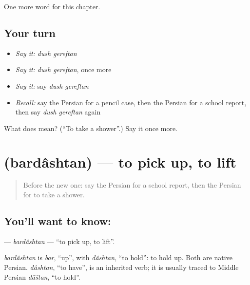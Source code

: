 \begin{grammarlens}[title={What you've built}]
One more word for this chapter.
\end{grammarlens}

\subsection*{Your turn}
\begin{itemize}
\raggedright
  \item \emph{Say it:} \emph{dush gereftan}
  \item \emph{Say it:} \emph{dush gereftan}, once more
  \item \emph{Say it:} say \emph{dush gereftan}
  \item \emph{Recall:} say the Persian for a pencil case, then the Persian for a school report, then say \emph{dush gereftan} again
\end{itemize}

\begin{tcolorbox}[breakable,colback=teal!4,colframe=teal!35!black,title={Before you move on}]
What does   mean? (\textquotedblleft{}To take a shower\textquotedblright{}.) Say it once more.
\end{tcolorbox}
\section[\texorpdfstring{\fa{برداشتن} (bardâshtan)}{برداشتن (bardâshtan)}]{ (bardâshtan) — to pick up, to lift}

\label{lesson:FA-C179-bardashtan}



\begin{quote}
Before the new one: say the Persian for a school report, then the Persian for to take a shower.
\end{quote}

\subsection*{You'll want to know: }
\textbf{} — \emph{bardâshtan} — \textquotedblleft{}to pick up, to lift\textquotedblright{}.

\begin{cousinweb}
\emph{bardâshtan} is \emph{bar}, \textquotedblleft{}up\textquotedblright{}, with \emph{dâshtan}, \textquotedblleft{}to hold\textquotedblright{}: to hold up. Both are native Persian. \emph{dâshtan}, \textquotedblleft{}to have\textquotedblright{}, is an inherited verb; it is usually traced to Middle Persian \emph{dāštan}, \textquotedblleft{}to hold\textquotedblright{}.
\end{cousinweb}

